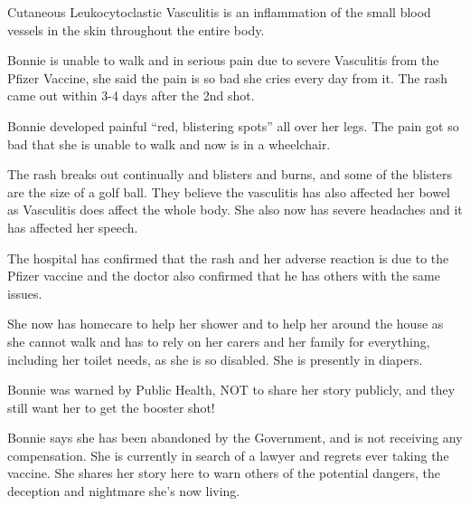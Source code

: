 Cutaneous Leukocytoclastic Vasculitis is an inflammation of the small blood
vessels in the skin throughout the entire body.

Bonnie is unable to walk and in serious pain due to severe Vasculitis from the
Pfizer Vaccine, she said the pain is so bad she cries every day from it. The
rash came out within 3-4 days after the 2nd shot.

Bonnie developed painful “red, blistering spots” all over her legs. The pain got
so bad that she is unable to walk and now is in a wheelchair.

The rash breaks out continually and blisters and burns, and some of the blisters
are the size of a golf ball. They believe the vasculitis has also affected her
bowel as Vasculitis does affect the whole body. She also now has severe
headaches and it has affected her speech.

The hospital has confirmed that the rash and her adverse reaction is due to the
Pfizer vaccine and the doctor also confirmed that he has others with the same
issues.

She now has homecare to help her shower and to help her around the house as she
cannot walk and has to rely on her carers and her family for everything,
including her toilet needs, as she is so disabled. She is presently in diapers.

Bonnie was warned by Public Health, NOT to share her story publicly, and they
still want her to get the booster shot!

Bonnie says she has been abandoned by the Government, and is not receiving any
compensation. She is currently in search of a lawyer and regrets ever taking the
vaccine. She shares her story here to warn others of the potential dangers, the
deception and nightmare she’s now living.

